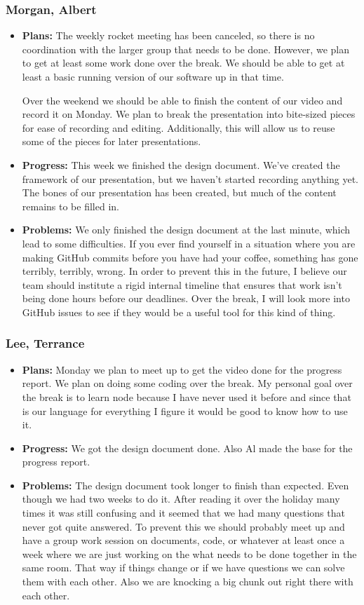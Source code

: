 \documentclass[10pt,draftclsnofoot,onecolumn]{IEEEtran}
\begin{document}
\subsubsection{Morgan, Albert}
\begin{itemize}
	\item \textbf{Plans: }
	The weekly rocket meeting has been canceled, so there is no coordination with the larger group that needs to be done. However, we plan to get at least some work done over the break. We should be able to get at least a basic running version of our software up in that time.
	
	Over the weekend we should be able to finish the content of our video and record it on Monday. We plan to break the presentation into bite-sized pieces for ease of recording and editing. Additionally, this will allow us to reuse some of the pieces for later presentations.
	\item \textbf{Progress: }
	This week we finished the design document. We've created the framework of our presentation, but we haven't started recording anything yet. The bones of our presentation has been created, but much of the content remains to be filled in.
	\item \textbf{Problems: }
	We only finished the design document at the last minute, which lead to some difficulties. If you ever find yourself in a situation where you are making GitHub commits before you have had your coffee, something has gone terribly, terribly, wrong. In order to prevent this in the future, I believe our team should institute a rigid internal timeline that ensures that work isn't being done hours before our deadlines. Over the break, I will look more into GitHub issues to see if they would be a useful tool for this kind of thing.
\end{itemize}
\subsubsection{Lee, Terrance}
\begin{itemize}
	\item \textbf{Plans: }Monday we plan to meet up to get the video done for the progress report.
We plan on doing some coding over the break. My personal goal over the break is to learn node because I have never used it before and since that is our language for everything I figure it would be good to know how to use it.
	\item \textbf{Progress: }We got the design document done. Also Al made the base for the progress report.
	\item \textbf{Problems: }The design document took longer to finish than expected. Even though we had two weeks to do it. After reading it over the holiday many times it was still confusing and it seemed that we had many questions that never got quite answered. To prevent this we should probably meet up and have a group work session on documents, code, or whatever at least once a week where we are just working on the what needs to be done together in the same room. That way if things change or if we have questions we can solve them with each other. Also we are knocking a big chunk out right there with each other.
\end{itemize}
\end{document}
